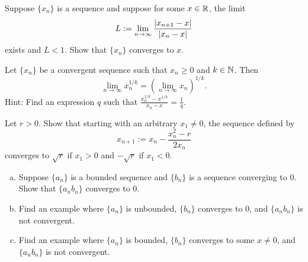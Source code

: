 \begin{exercise}
Suppose $\{ x_n \}$ is a sequence and suppose for
some $x \in {\mathbb{R}}$, the limit
\begin{equation*}
L := \lim_{n \to \infty} \frac{\left\lvert {x_{n+1}-x} \right\rvert}{\left\lvert {x_n-x} \right\rvert}
\end{equation*}
exists and $L < 1$.  Show that $\{ x_n \}$ converges to $x$.
\end{exercise}

\begin{exercise}[Challenging]
Let $\{ x_n \}$ be a convergent sequence such
that $x_n \geq 0$ and $k \in {\mathbb{N}}$.
Then
\begin{equation*}
\lim_{n\to\infty} x_n^{1/k} =
{\left( \lim_{n\to\infty} x_n \right)}^{1/k} .
\end{equation*}
Hint: Find an expression $q$ such that $\frac{x_n^{1/k}-x^{1/k}}{x_n-x} =
\frac{1}{q}$.
\end{exercise}

\begin{exercise}
Let $r > 0$.  Show that starting with an arbitrary $x_1 \not= 0$, the sequence
defined by
\begin{equation*}
x_{n+1} := x_n - \frac{x_n^2-r}{2x_n}
\end{equation*}
converges to $\sqrt{r}$ if $x_1 > 0$ and $-\sqrt{r}$ if $x_1 < 0$.
\end{exercise}

\begin{samepage}
\begin{exercise}
\leavevmode
\begin{enumerate}[a)]
\item
Suppose $\{ a_n \}$ is a bounded sequence and $\{ b_n \}$ is a sequence
converging to 0. Show that $\{ a_n b_n \}$ converges to 0.
\item
Find an example where $\{ a_n \}$ is unbounded, $\{ b_n \}$ converges to
0, and $\{ a_n b_n \}$ is not convergent.
\item
Find an example where $\{ a_n \}$ is bounded, $\{ b_n \}$ converges to
some $x \not= 0$, and $\{ a_n b_n \}$ is not convergent.
\end{enumerate}
\end{exercise}
\end{samepage}

